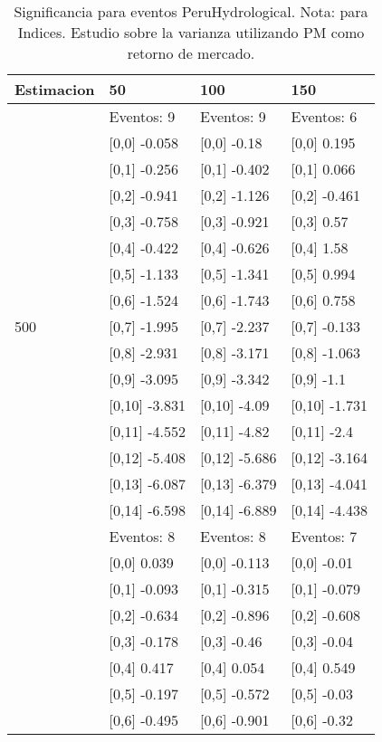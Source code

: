 \begin{table}

\caption{Significancia para eventos PeruHydrological. Nota: para Indices. Estudio sobre la varianza utilizando PM como retorno de mercado.}
\centering
\begin{tabular}[t]{llll}
\toprule
Estimacion & 50 & 100 & 150\\
\midrule
 & Eventos:  9 & Eventos:  9 & Eventos:  6\\
 & {}[0,0] -0.058 & {}[0,0] -0.18 & {}[0,0] 0.195\\
 & {}[0,1] -0.256 & {}[0,1] -0.402 & {}[0,1] 0.066\\
 & {}[0,2] -0.941 & {}[0,2] -1.126 & {}[0,2] -0.461\\
 & {}[0,3] -0.758 & {}[0,3] -0.921 & {}[0,3] 0.57\\
\addlinespace
 & {}[0,4] -0.422 & {}[0,4] -0.626 & {}[0,4] 1.58\\
 & {}[0,5] -1.133 & {}[0,5] -1.341 & {}[0,5] 0.994\\
 & {}[0,6] -1.524 & {}[0,6] -1.743 & {}[0,6] 0.758\\
500 & {}[0,7] -1.995 & {}[0,7] -2.237 & {}[0,7] -0.133\\
 & {}[0,8] -2.931 & {}[0,8] -3.171 & {}[0,8] -1.063\\
\addlinespace
 & {}[0,9] -3.095 & {}[0,9] -3.342 & {}[0,9] -1.1\\
 & {}[0,10] -3.831 & {}[0,10] -4.09 & {}[0,10] -1.731\\
 & {}[0,11] -4.552 & {}[0,11] -4.82 & {}[0,11] -2.4\\
 & {}[0,12] -5.408 & {}[0,12] -5.686 & {}[0,12] -3.164\\
 & {}[0,13] -6.087 & {}[0,13] -6.379 & {}[0,13] -4.041\\
\addlinespace
 & {}[0,14] -6.598 & {}[0,14] -6.889 & {}[0,14] -4.438\\
 & Eventos:  8 & Eventos:  8 & Eventos:  7\\
 & {}[0,0] 0.039 & {}[0,0] -0.113 & {}[0,0] -0.01\\
 & {}[0,1] -0.093 & {}[0,1] -0.315 & {}[0,1] -0.079\\
 & {}[0,2] -0.634 & {}[0,2] -0.896 & {}[0,2] -0.608\\
\addlinespace
 & {}[0,3] -0.178 & {}[0,3] -0.46 & {}[0,3] -0.04\\
 & {}[0,4] 0.417 & {}[0,4] 0.054 & {}[0,4] 0.549\\
 & {}[0,5] -0.197 & {}[0,5] -0.572 & {}[0,5] -0.03\\
 & {}[0,6] -0.495 & {}[0,6] -0.901 & {}[0,6] -0.32\\

\end{tabular}
\end{table}
